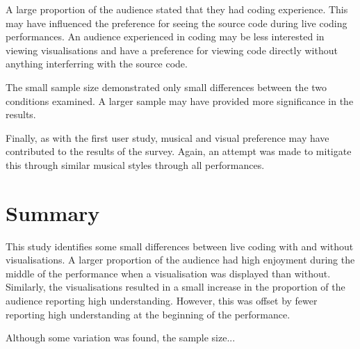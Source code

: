 
A large proportion of the audience stated that they had coding experience. This may have influenced the preference for seeing the source code during live coding performances. An audience experienced in coding may be less interested in viewing visualisations and have a preference for viewing code directly without anything interferring with the source code.

The small sample size demonstrated only small differences between the two conditions examined. A larger sample may have provided more significance in the results. \more

Finally, as with the first user study, musical and visual preference may have contributed to the results of the survey. Again, an attempt was made to mitigate this through similar musical styles through all performances.

\section{Summary}

This study identifies some small differences between live coding with and without visualisations. A larger proportion of the audience had high enjoyment during the middle of the performance when a visualisation was displayed than without. Similarly, the visualisations resulted in a small increase in the proportion of the audience reporting high understanding. However, this was offset by fewer reporting high understanding at the beginning of the performance. 

Although some variation was found, the sample size... \more









